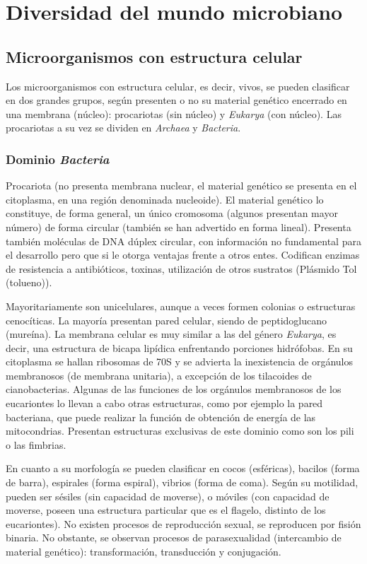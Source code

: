 \section{Diversidad del mundo microbiano}
\subsection{Microorganismos con estructura celular}
Los microorganismos con estructura celular, es decir, vivos, se pueden clasificar en dos grandes grupos, según presenten o no su material genético encerrado en una membrana (núcleo): procariotas (sin núcleo) y \textit{Eukarya} (con núcleo). Las procariotas a su vez se dividen en \textit{Archaea} y \textit{Bacteria}.
\subsubsection{Dominio \textit{Bacteria}}
Procariota (no presenta membrana nuclear, el material genético se presenta en el citoplasma, en una región denominada nucleoide). El material genético lo constituye, de forma general, un único cromosoma (algunos presentan mayor número) de forma circular (también se han advertido en forma lineal). Presenta también moléculas de DNA dúplex circular, con información no fundamental para el desarrollo pero que si le otorga ventajas frente a otros entes. Codifican enzimas de resistencia a antibióticos, toxinas, utilización de otros sustratos (Plásmido Tol (tolueno)).

Mayoritariamente son unicelulares, aunque a veces formen colonias o estructuras cenocíticas. La mayoría presentan pared celular, siendo de peptidoglucano (mureína). La membrana celular es muy similar a las del género \textit{Eukarya}, es decir, una estructura de bicapa lipídica enfrentando porciones hidrófobas.  En su citoplasma se hallan ribosomas de 70S y se advierta la inexistencia de orgánulos membranosos (de membrana unitaria), a excepción de los tilacoides de cianobacterias. Algunas de las funciones de los orgánulos membranosos de los eucariontes lo llevan a cabo otras estructuras, como por ejemplo la pared bacteriana, que puede realizar la función de obtención de energía de las mitocondrias. Presentan estructuras exclusivas de este dominio como son los pili o las fimbrias.

En cuanto a su morfología se pueden clasificar en cocos (esféricas), bacilos (forma de barra), espirales (forma espiral), vibrios (forma de coma). Según su motilidad, pueden ser sésiles (sin capacidad de moverse), o móviles (con capacidad de moverse, poseen una estructura particular que es el flagelo, distinto de los eucariontes). No existen procesos de reproducción sexual, se reproducen por fisión binaria. No obstante, se observan procesos de parasexualidad (intercambio de material genético): transformación, transducción y conjugación.
